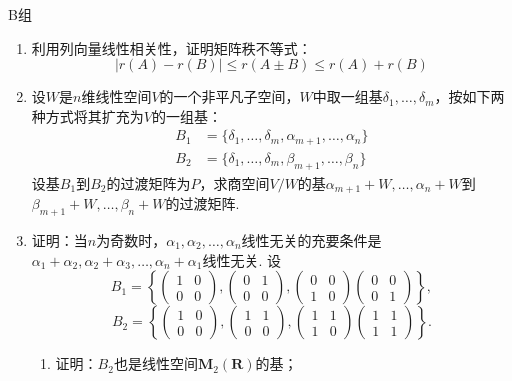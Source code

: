 \centerline{\heiti B组}
\begin{enumerate}
    \item 利用列向量线性相关性，证明矩阵秩不等式：\[|r(A)-r(B)|\leqslant r(A\pm B) \leqslant r(A)+r(B)\]

    \item 设$W$是$n$维线性空间$V$的一个非平凡子空间，$W$中取一组基$\delta_1,\ldots,\delta_m$，按如下两种方式将其扩充为$V$的一组基：
          \begin{align*}
              B_1 & =\{\delta_1,\ldots,\delta_m,\alpha_{m+1},\ldots,\alpha_n\} \\
              B_2 & =\{\delta_1,\ldots,\delta_m,\beta_{m+1},\ldots,\beta_n\}
          \end{align*}
          设基$B_1$到$B_2$的过渡矩阵为$P$，求商空间$V/W$的基$\alpha_{m+1}+W,\ldots,\alpha_n+W$到$\beta_{m+1}+W,\ldots,\beta_n+W$的过渡矩阵.

    \item 证明：当$n$为奇数时，$\alpha_1,\alpha_2,\ldots,\alpha_n$线性无关的充要条件是$\alpha_1+\alpha_2,\alpha_2+\alpha_3,\ldots,\alpha_n+\alpha_1$线性无关. 设
          \[B_1=\left\{\begin{pmatrix}
                  1 & 0 \\ 0 & 0
              \end{pmatrix},\begin{pmatrix}
                  0 & 1 \\ 0 & 0
              \end{pmatrix},\begin{pmatrix}
                  0 & 0 \\ 1 & 0
              \end{pmatrix}\begin{pmatrix}
                  0 & 0 \\ 0 & 1
              \end{pmatrix}\right\},\]
          \[B_2=\left\{\begin{pmatrix}
                  1 & 0 \\ 0 & 0
              \end{pmatrix},\begin{pmatrix}
                  1 & 1 \\ 0 & 0
              \end{pmatrix},\begin{pmatrix}
                  1 & 1 \\ 1 & 0
              \end{pmatrix}\begin{pmatrix}
                  1 & 1 \\ 1 & 1
              \end{pmatrix}\right\}.\]
          \begin{enumerate}
              \item 证明：$B_2$也是线性空间$\mathbf{M}_2(\mathbf{R})$的基；


\end{enumerate}
\end{enumerate}
